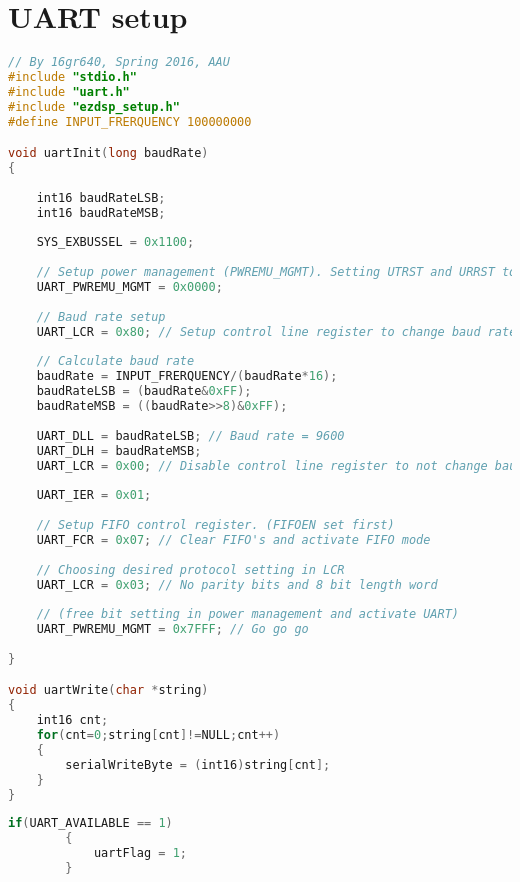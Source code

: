 \section{UART setup}

\begin{lstlisting}[language=C, caption = {Initialization of UART},label={listingUartInit}]
// By 16gr640, Spring 2016, AAU
#include "stdio.h"
#include "uart.h"
#include "ezdsp_setup.h"
#define INPUT_FRERQUENCY 100000000

void uartInit(long baudRate)
{
	
	int16 baudRateLSB;
	int16 baudRateMSB;
	
	SYS_EXBUSSEL = 0x1100;
	
	// Setup power management (PWREMU_MGMT). Setting UTRST and URRST to 0
	UART_PWREMU_MGMT = 0x0000;
	
	// Baud rate setup 
	UART_LCR = 0x80; // Setup control line register to change baud rate
	
	// Calculate baud rate
	baudRate = INPUT_FRERQUENCY/(baudRate*16);
	baudRateLSB = (baudRate&0xFF);
	baudRateMSB = ((baudRate>>8)&0xFF);
	
	UART_DLL = baudRateLSB; // Baud rate = 9600
	UART_DLH = baudRateMSB;
	UART_LCR = 0x00; // Disable control line register to not change baud rate
	
	UART_IER = 0x01;
	
	// Setup FIFO control register. (FIFOEN set first) 
	UART_FCR = 0x07; // Clear FIFO's and activate FIFO mode
	
	// Choosing desired protocol setting in LCR
	UART_LCR = 0x03; // No parity bits and 8 bit length word
	
	// (free bit setting in power management and activate UART)
	UART_PWREMU_MGMT = 0x7FFF; // Go go go
	
}

void uartWrite(char *string)
{
	int16 cnt;
	for(cnt=0;string[cnt]!=NULL;cnt++)
	{
		serialWriteByte = (int16)string[cnt];
	}
}
\end{lstlisting}

\begin{lstlisting}[language=C, caption = {Set a flag high if data available in FIFO},label={listingUartFlag}]
    	if(UART_AVAILABLE == 1)
    	{	
			uartFlag = 1;
		}
\end{lstlisting}

